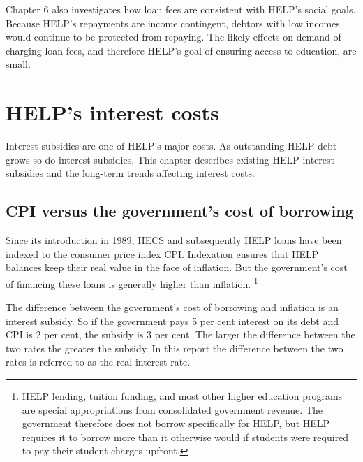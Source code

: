 \documentclass[embargoed]{grattan}
\begin{document}
Chapter 6 also investigates how loan fees are consistent with \gls{HELP}'s social goals.
Because \gls{HELP}'s repayments are income contingent, debtors with low incomes would continue to be protected from repaying.
The likely effects on demand of charging loan fees, and therefore \gls{HELP}'s goal of ensuring access to education, are small.

\chapter[HELP's interest costs]{\gls{HELP}'s interest costs}\label{chap:helps-interest-costs}

Interest subsidies are one of \gls{HELP}'s major costs.
As outstanding \gls{HELP} debt grows so do interest subsidies.
This chapter describes existing \gls{HELP} interest subsidies and the long-term trends affecting interest costs.

\section[CPI versus the government's cost of borrowing]{\gls{CPI} versus the government's cost of borrowing}\label{cpi-versus-the-governments-cost-of-borrowing}

Since its introduction in 1989, \gls{HECS} and subsequently \gls{HELP} loans have been indexed to the consumer price index \gls{CPI}.
Indexation ensures that \gls{HELP} balances keep their real value in the face of inflation.
But the government's cost of financing these loans is generally higher than inflation.%
\footnote{HELP lending, tuition funding, and most other higher education programs are special appropriations from consolidated government revenue.
The government therefore does not borrow specifically for \gls{HELP}, but \gls{HELP} requires it to borrow more than it otherwise would if students were required to pay their student charges upfront.}

The difference between the government's cost of borrowing and inflation is an interest subsidy.
So if the government pays 5 per cent interest on its debt and \gls{CPI} is 2 per cent, the subsidy is 3 per cent.
The larger the difference between the two rates the greater the subsidy.
In this report the difference between the two rates is referred to as the real interest rate.
\end{document}

